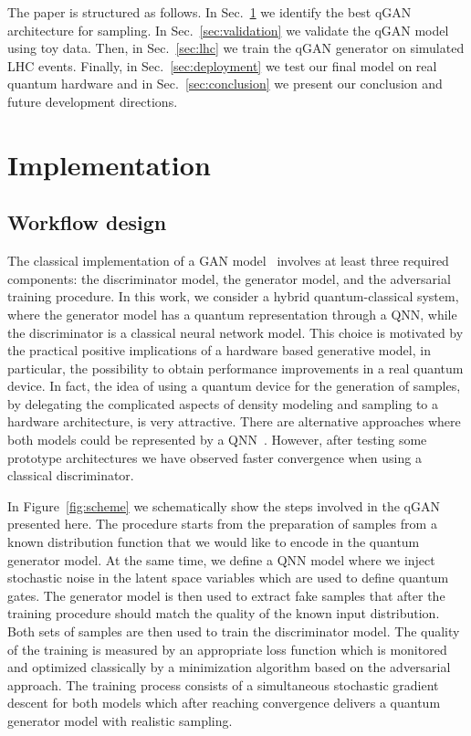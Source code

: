 \documentclass[twocolumn,preprintnumbers,superscriptaddress]{revtex4-2}
\begin{document}
The paper is structured as follows. In Sec.~\ref{sec:implementation} we identify
the best qGAN architecture for sampling. In Sec.~\ref{sec:validation} we
validate the qGAN model using toy data. Then, in Sec.~\ref{sec:lhc} we train the qGAN
generator on simulated LHC events. Finally, in Sec.~\ref{sec:deployment} we test
our final model on real quantum hardware and in Sec.~\ref{sec:conclusion} we
present our conclusion and future development directions.

\section{Implementation}
\label{sec:implementation}

\subsection{Workflow design}

The classical implementation of a GAN model~\cite{goodfellow2014generative}
involves at least three required components: the discriminator model, the
generator model, and the adversarial training procedure. In this work, we
consider a hybrid quantum-classical system, where the generator model has a
quantum representation through a QNN, while the
discriminator is a classical neural network model. This choice is motivated by
the practical positive implications of a hardware based generative model, in
particular, the possibility to obtain performance improvements in a real quantum
device. In fact, the idea of using a quantum device for the generation of
samples, by delegating the complicated aspects of density modeling and sampling
to a hardware architecture, is very attractive.
%
There are alternative approaches where both models could be represented by a
QNN~\cite{dallaire2018quantum, hu2019quantum, benedetti2019adversarial, romero2021variational, niu2021entangling}. However, after testing some prototype architectures we
have observed faster convergence when using a classical discriminator.

In Figure~\ref{fig:scheme} we schematically show the steps involved in the qGAN
presented here. The procedure starts from the preparation of samples from a
known distribution function that we would like to encode in the quantum
generator model. At the same time, we define a QNN model where
we inject stochastic noise in the latent space variables which are used to
define quantum gates. The generator model is then used to extract fake samples
that after the training procedure should match the quality of the known input
distribution. Both sets of samples are then used to train the discriminator
model. The quality of the training is measured by an appropriate loss function
which is monitored and optimized classically by a minimization algorithm based on
the adversarial approach. The training process consists of a simultaneous
stochastic gradient descent for both models which after reaching convergence
delivers a quantum generator model with realistic sampling.
\end{document}
